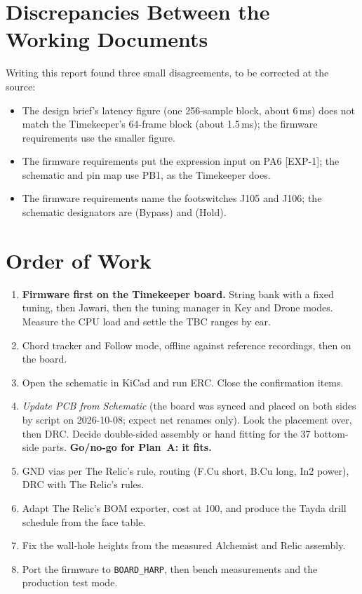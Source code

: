 \section{Discrepancies Between the Working Documents}
Writing this report found three small disagreements, to be corrected at the source:
\begin{itemize}
  \item The design brief's latency figure (one 256-sample block, about 6\,ms) does not match the Timekeeper's 64-frame block (about 1.5\,ms); the firmware requirements use the smaller figure.
  \item The firmware requirements put the expression input on PA6 [EXP-1]; the schematic and pin map use PB1, as the Timekeeper does.
  \item The firmware requirements name the footswitches J105 and J106; the schematic designators are  (Bypass) and  (Hold).
\end{itemize}

\section{Order of Work}
\begin{enumerate}
  \item \textbf{Firmware first on the Timekeeper board.} String bank with a fixed tuning, then Jawari, then the tuning manager in Key and Drone modes. Measure the CPU load and settle the TBC ranges by ear.
  \item Chord tracker and Follow mode, offline against reference recordings, then on the board.
  \item Open the schematic in KiCad and run ERC. Close the confirmation items.
  \item \emph{Update PCB from Schematic} (the board was synced and placed on both sides by script on 2026-10-08; expect net renames only). Look the placement over, then DRC. Decide double-sided assembly or hand fitting for the 37 bottom-side parts. \textbf{Go/no-go for Plan~A: it fits.}
  \item GND vias per The Relic's rule, routing (F.Cu short, B.Cu long, In2 power), DRC with The Relic's rules.
  \item Adapt The Relic's BOM exporter, cost at 100, and produce the Tayda drill schedule from the face table.
  \item Fix the wall-hole heights from the measured Alchemist and Relic assembly.
  \item Port the firmware to \texttt{BOARD\_HARP}, then bench measurements and the production test mode.
\end{enumerate}

